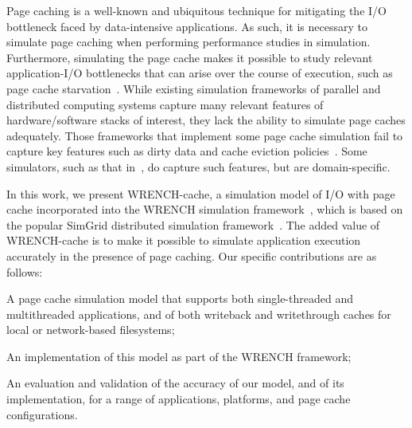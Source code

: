 \documentclass[conference]{IEEEtran}
\begin{document}
        Page caching is a well-known and ubiquitous technique for mitigating the I/O bottleneck
        faced by data-intensive applications. As such, it is necessary to simulate page caching
        when performing performance studies in simulation.
        Furthermore, simulating the page cache makes it possible to study relevant application-I/O
        bottlenecks that can arise over the course of execution, such as page cache
        starvation~\cite{zhuang2017}.
        While existing simulation frameworks of parallel and distributed computing
        systems  capture many relevant features of hardware/software stacks of interest, 
        they lack the ability to simulate page caches adequately. Those frameworks
        that implement some page cache simulation
        fail to capture key features such
        as dirty data and cache eviction policies~\cite{nunez2012simcan,nunez2012icancloud}. 
        Some simulators, such as that in~\cite{xu2018saving}, do capture such features,
        but are domain-specific. 


	In this work, we present WRENCH-cache, a simulation model of I/O
	with page cache incorporated into the WRENCH simulation framework~\cite{casanova2018wrench},
	which is  based on the popular SimGrid distributed simulation framework~\cite{XXX}.
	The added value of WRENCH-cache is to make it possible to simulate 
        application execution accurately in the presence of page caching. Our specific 
        contributions are as follows:
    \begin{compactitem}
        \item A page cache simulation model that supports 
	both single-threaded and multithreaded applications, and of both
	writeback and writethrough caches for local or network-based
	filesystems;
        \item An implementation of this model as part of the WRENCH framework; 
        \item An evaluation and validation of the accuracy of our model, and of its implementation,
              for a range of applications, platforms, and page cache configurations. 
    \end{compactitem}
\end{document}
